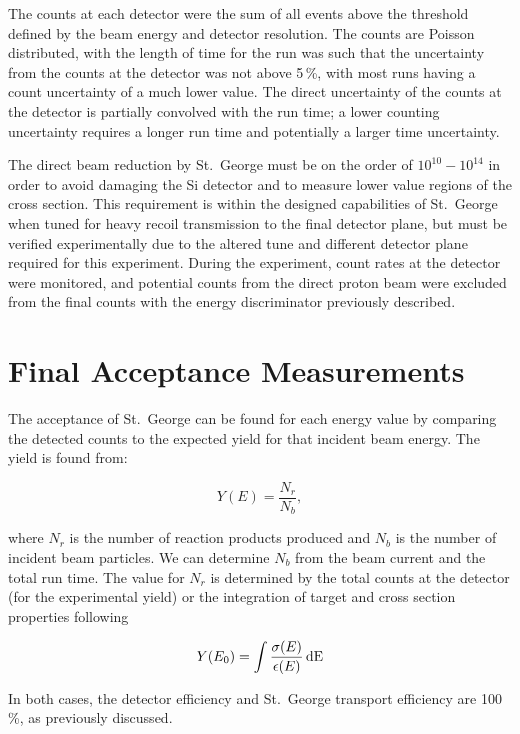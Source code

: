 The counts at each detector were the sum of all events above the
threshold defined by the beam energy and detector resolution. The counts
are Poisson distributed, with the length of time for the run was such
that the uncertainty from the counts at the detector was not above 5\,\%,
with most runs having a count uncertainty of a much lower value. The
direct uncertainty of the counts at the detector is partially convolved
with the run time; a lower counting uncertainty requires a longer run
time and potentially a larger time uncertainty.

The direct beam reduction by St.\ George must be on the order of
$10^{10}-10^{14}$ in order to avoid damaging the Si detector and to
measure lower value regions of the cross section. This requirement is
within the designed capabilities of St.\ George when tuned for heavy
recoil transmission to the final detector plane, but must be verified
experimentally due to the altered tune and different detector plane
required for this experiment. During the experiment, count rates at the
detector were monitored, and potential counts from the direct proton
beam were excluded from the final counts with the energy discriminator
previously described.

\section{Final Acceptance Measurements}
\label{sec:final-acceptance-measurements}

The acceptance of St.\ George can be found for each energy value by
comparing the detected counts to the expected yield for that incident
beam energy. The yield is found from:

\begin{equation}
    Y(E) = \frac{N_r}{N_b},
\end{equation}

where $N_r$ is the number of reaction products produced and $N_b$ is the
number of incident beam particles. We can determine $N_b$ from the beam
current and the total run time. The value for $N_r$ is determined by the
total counts at the detector (for the experimental yield) or the
integration of target and cross section properties following

\begin{equation}
    Y(E_0) = \int \frac{\sigma(E)}{\epsilon(E)}\,\rm{d}E
\end{equation}

In both cases, the detector efficiency and St.\ George transport
efficiency are 100\,\%, as previously discussed.

